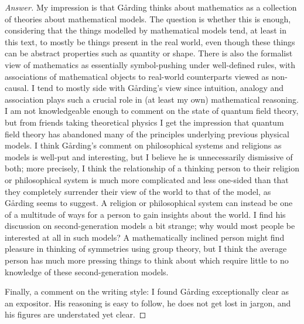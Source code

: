 \begin{proof}[Answer]
  My impression is that Gårding thinks about mathematics as a collection of theories about mathematical models. The question is whether this is enough, considering that the things modelled by mathematical models tend, at least in this text, to mostly be things present in the real world, even though these things can be abstract properties such as quantity or shape. There is also the formalist view of mathematics as essentially symbol-pushing under well-defined rules, with associations of mathematical objects to real-world counterparts viewed as non-causal. I tend to mostly side with Gårding's view since intuition, analogy and association plays such a crucial role in (at least my own) mathematical reasoning. I am not knowledgeable enough to comment on the state of quantum field theory, but from friends taking theoretical physics I get the impression that quantum field theory has abandoned many of the principles underlying previous physical models. I think Gårding's comment on philosophical systems and religions as models is well-put and interesting, but I believe he is unnecessarily dismissive of both; more precisely, I think the relationship of a thinking person to their religion or philosophical system is much more complicated and less one-sided than that they completely surrender their view of the world to that of the model, as Gårding seems to suggest. A religion or philosophical system can instead be one of a multitude of ways for a person to gain insights about the world. I find his discussion on second-generation models a bit strange; why would most people be interested at all in such models? A mathematically inclined person might find pleasure in thinking of symmetries using group theory, but I think the average person has much more pressing things to think about which require little to no knowledge of these second-generation models.

  Finally, a comment on the writing style: I found Gårding exceptionally clear as an expositor. His reasoning is easy to follow, he does not get lost in jargon, and his figures are understated yet clear.


\end{proof}

